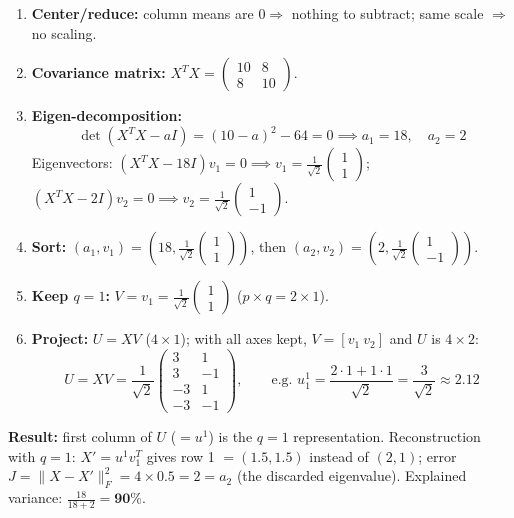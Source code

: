 \documentclass[10pt,a4paper]{article}
\begin{document}
\begin{enumerate}[leftmargin=18pt, itemsep=2pt, topsep=1pt]
    \item \textbf{Center/reduce:} column means are $0 \Rightarrow$ nothing to subtract; same scale $\Rightarrow$ no scaling.
    \item \textbf{Covariance matrix:} $X^T X = \begin{pmatrix} 10 & 8 \\ 8 & 10 \end{pmatrix}$.
    \item \textbf{Eigen-decomposition:}
    \[
    \det(X^T X - a I) = (10 - a)^2 - 64 = 0 \implies a_1 = 18, \quad a_2 = 2
    \]
    Eigenvectors: $(X^TX - 18I)v_1 = 0 \implies v_1 = \frac{1}{\sqrt{2}}\begin{pmatrix} 1 \\ 1 \end{pmatrix}$; \quad
    $(X^TX - 2I)v_2 = 0 \implies v_2 = \frac{1}{\sqrt{2}}\begin{pmatrix} 1 \\ -1 \end{pmatrix}$.
    \item \textbf{Sort:} $(a_1, v_1) = \left(18, \frac{1}{\sqrt{2}}\begin{pmatrix}1\\1\end{pmatrix}\right)$, then $(a_2, v_2) = \left(2, \frac{1}{\sqrt{2}}\begin{pmatrix}1\\-1\end{pmatrix}\right)$.
    \item \textbf{Keep $q = 1$:} $V = v_1 = \frac{1}{\sqrt{2}}\begin{pmatrix} 1 \\ 1 \end{pmatrix}$ ($p \times q = 2 \times 1$).
    \item \textbf{Project:} $U = XV$ ($4 \times 1$); with all axes kept, $V = [v_1 \ v_2]$ and $U$ is $4 \times 2$:
    \[
    U = XV = \frac{1}{\sqrt{2}}\begin{pmatrix} 3 & 1 \\ 3 & -1 \\ -3 & 1 \\ -3 & -1 \end{pmatrix}, \qquad \text{e.g. } u_1^1 = \frac{2\cdot 1 + 1\cdot 1}{\sqrt{2}} = \frac{3}{\sqrt{2}} \approx 2.12
    \]
\end{enumerate}
\textbf{Result:} first column of $U$ ($= u^1$) is the $q = 1$ representation. Reconstruction with $q = 1$: $X' = u^1 v_1^T$ gives row 1 $= (1.5, 1.5)$ instead of $(2, 1)$; error $J = \|X - X'\|_F^2 = 4 \times 0.5 = 2 = a_2$ (the discarded eigenvalue). Explained variance: $\frac{18}{18+2} = \mathbf{90\%}$.
\end{document}
